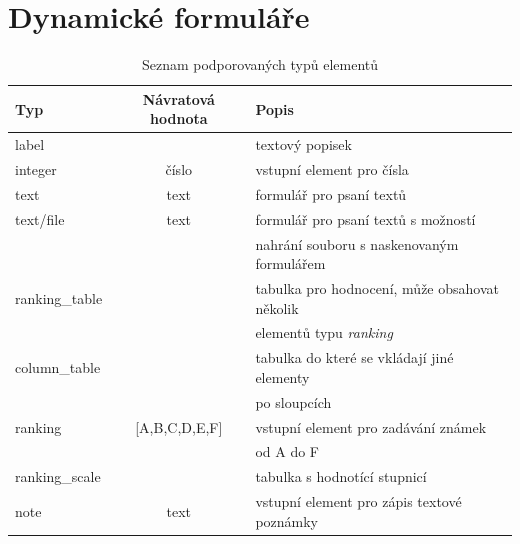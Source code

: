 \chapter{Dynamické formuláře}
\label{sec:forms}
\begin{table}[h]
\begin{center}
\begin{tabular}{|l|c|l|}

\hline
\textbf{Typ} & \textbf{Návratová hodnota} & \textbf{Popis} \\ \hline
label &  & textový popisek \\\hline
integer & číslo & vstupní element pro čísla \\ \hline
text & text & formulář pro psaní textů \\\hline
text/file & text & formulář pro psaní textů s možností \\ & &  nahrání souboru s naskenovaným formulářem \\\hline
ranking\_table &  & tabulka pro hodnocení, může obsahovat několik \\ & & elementů typu \textit{ranking} \\\hline
column\_table & & tabulka do které se vkládají jiné elementy \\ & &  po sloupcích \\\hline
ranking & [A,B,C,D,E,F] & vstupní element pro zadávání známek \\ & &   od A do F \\\hline
ranking\_scale & & tabulka s hodnotící stupnicí \\\hline
note & text & vstupní element pro zápis textové poznámky \\\hline

\end{tabular}
\caption{Seznam podporovaných typů elementů}
\label{tab:elements}
\end{center}
\end{table}


